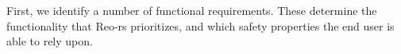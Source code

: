 First, we identify a number of functional requirements. These determine the functionality that Reo-rs prioritizes, and which safety properties the end user is able to rely upon.


%
%
